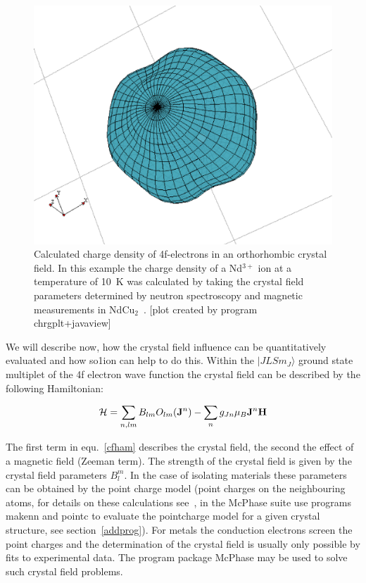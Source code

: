 \begin{figure}[ht]
\includegraphics[angle=0,width=0.7\columnwidth]{figsrc/chrgpla.eps}
\caption{\label{chrgplb}
Calculated charge density of 4f-electrons in an orthorhombic crystal field. In
this example the charge density of a Nd$^{3+}$ ion at a temperature of 10~K was 
calculated by taking the crystal
field parameters determined by neutron spectroscopy and 
magnetic measurements in NdCu$_2$~\cite{gratz91-9297}.
[plot created by program {\prg chrgplt+javaview}]}
\end{figure}

We will describe now, how the crystal field influence can be quantitatively evaluated
and how {\prg so1ion}  can help to do this.
Within the $|JLSm_J \rangle$ ground state multiplet of the 4f electron wave function 
the crystal field can be described by the following Hamiltonian:

\begin{equation}
\label{cfham}
 {\mathcal H}= \sum_{n,lm} B_{lm} O_{lm}({\mathbf J}^n) 
	     - \sum_{n} g_{Jn} \mu_B {\mathbf J}^n {\mathbf H} 
\end{equation}

The first term in equ.~\ref{cfham} describes the crystal field, the second the
effect of a magnetic field (Zeeman term). The strength of the crystal field is given by the
crystal field parameters $B_l^m$. In the case of isolating materials these
parameters can be obtained by the point charge model (point charges on the 
neighbouring atoms, for details on these calculations see~\cite{hutchings64-227},
in the {\prg McPhase} suite use programs {\prg makenn} and {\prg pointc} to evaluate
the pointcharge model for a given crystal structure, see section~\ref{addprog}).
For metals the conduction electrons screen the point charges and the determination
of the crystal field is usually only possible by fits to experimental data. 
The program package {\prg McPhase} may be used to solve such crystal field problems.

